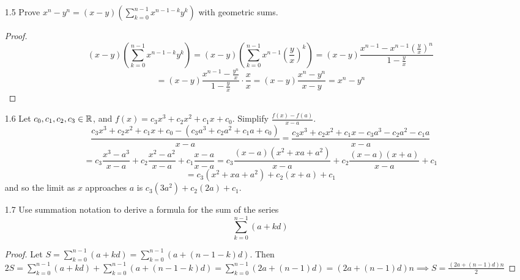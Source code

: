 \documentclass[12pt]{article}
\begin{document}
\begin{itemize}
		\item [1.5] Prove $x^n-y^n = (x-y)(\sum_{k=0}^{n-1}x^{n-1-k}y^k)$ with geometric sums.
		\begin{proof}
			\[(x-y)(\sum_{k=0}^{n-1}x^{n-1-k}y^k) = (x-y)(\sum_{k=0}^{n-1}x^{n-1}(\frac{y}{x})^k) = (x-y)\frac{x^{n-1}-x^{n-1}(\frac{y}{x})^{n}}{1-\frac{y}{x}}\]
			\[= (x-y)\frac{x^{n-1}-\frac{y^n}{x}}{1-\frac{y}{x}}\cdot\frac{x}{x} = (x-y)\frac{x^n-y^n}{x-y} = x^n-y^n\]
		\end{proof}
		
		\item [1.6] Let $c_0,c_1,c_2,c_3\in\mathbb{R}$, and $f(x)=c_3x^3+c_2x^2+c_1x+c_0$. Simplify $\frac{f(x)-f(a)}{x-a}$.
		\[\frac{c_3x^3+c_2x^2+c_1x+c_0 - (c_3a^3+c_2a^2+c_1a+c_0)}{x-a} = \frac{c_3x^3+c_2x^2+c_1x - c_3a^3-c_2a^2-c_1a}{x-a}\]
		\[ = c_3\frac{x^3-a^3}{x-a} + c_2\frac{x^2-a^2}{x-a} + c_1\frac{x-a}{x-a} = c_3\frac{(x-a)(x^2+xa+a^2)}{x-a} + c_2\frac{(x-a)(x+a)}{x-a} + c_1\] \[= c_3(x^2+xa+a^2) + c_2(x+a) + c_1\]
		and so the limit as $x$ approaches $a$ is $c_3(3a^2)+c_2(2a)+c_1$.
		
		\item [1.7] Use summation notation to derive a formula for the sum
		of the series $$\sum_{k=0}^{n-1}(a+kd)$$
		\begin{proof}
			Let $S = \sum_{k=0}^{n-1}(a+kd) = \sum_{k=0}^{n-1}(a+(n-1-k)d)$. Then $2S = \sum_{k=0}^{n-1}(a+kd) + \sum_{k=0}^{n-1}(a+(n-1-k)d) = \sum_{k=0}^{n-1} (2a+(n-1)d) = (2a+(n-1)d)n \implies S = \frac{(2a+(n-1)d)n}{2}$
		\end{proof}
	

\end{itemize}
\end{document}
